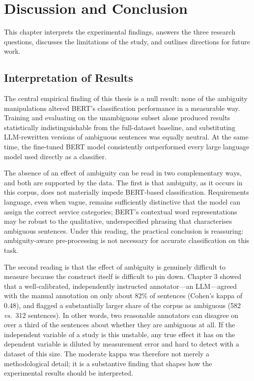 \chapter{Discussion and Conclusion}

This chapter interprets the experimental findings, answers the three research questions, discusses the limitations of the study, and outlines directions for future work.

\section{Interpretation of Results}

The central empirical finding of this thesis is a null result: none of the ambiguity manipulations altered BERT's classification performance in a measurable way. Training and evaluating on the unambiguous subset alone produced results statistically indistinguishable from the full-dataset baseline, and substituting LLM-rewritten versions of ambiguous sentences was equally neutral. At the same time, the fine-tuned BERT model consistently outperformed every large language model used directly as a classifier.

The absence of an effect of ambiguity can be read in two complementary ways, and both are supported by the data. The first is that ambiguity, as it occurs in this corpus, does not materially impede BERT-based classification. Requirements language, even when vague, remains sufficiently distinctive that the model can assign the correct service categories; BERT's contextual word representations may be robust to the qualitative, underspecified phrasing that characterises ambiguous sentences. Under this reading, the practical conclusion is reassuring: ambiguity-aware pre-processing is not necessary for accurate classification on this task.

The second reading is that the effect of ambiguity is genuinely difficult to measure because the construct itself is difficult to pin down. Chapter 3 showed that a well-calibrated, independently instructed annotator---an LLM---agreed with the manual annotation on only about 82\% of sentences (Cohen's kappa of 0.48), and flagged a substantially larger share of the corpus as ambiguous (582 \textit{vs.}~312 sentences). In other words, two reasonable annotators can disagree on over a third of the sentences about whether they are ambiguous at all. If the independent variable of a study is this unstable, any true effect it has on the dependent variable is diluted by measurement error and hard to detect with a dataset of this size. The moderate kappa was therefore not merely a methodological detail; it is a substantive finding that shapes how the experimental results should be interpreted.

